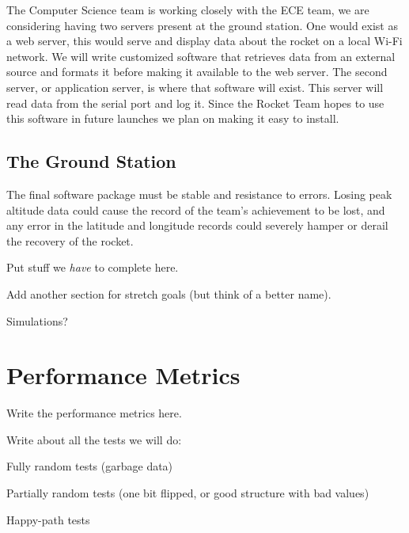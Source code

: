 \documentclass[10pt,journal,draftclsnofoot,onecolumn]{IEEEtran}
\begin{document}
The Computer Science team is 
working closely with the ECE team, we are considering having two servers 
present at the ground station. One would exist as a web server, this would
serve and display data about the rocket on a local Wi-Fi network. We will
write customized software that retrieves data from an external source and
formats it before making it available to the web server. The second server,
 or application server, is where that software will exist. This server will
 read data from the serial port and log it. Since the Rocket Team hopes to 
 use this software in future launches we plan on making it easy to install.

\subsection{The Ground Station}

The final software package must be stable and resistance to errors.
Losing peak altitude data could cause the record of the team's
achievement to be lost, and any error in the latitude
and longitude records could severely hamper or derail
the recovery of the rocket.


Put stuff we \textit{have} to complete here.

Add another section for stretch goals (but think of a better name).

Simulations?


\section{Performance Metrics}
Write the performance metrics here.

Write about all the tests we will do:

Fully random tests (garbage data)

Partially random tests (one bit flipped, or good structure with bad values)

Happy-path tests
\end{document}
